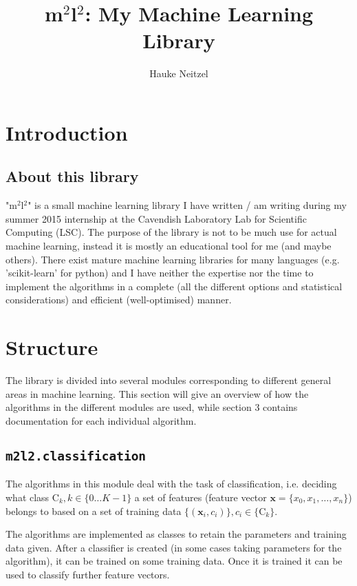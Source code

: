 \documentclass[a4paper, 12pt]{article}
\title{m$^2$l$^2$: My Machine Learning Library}
\author{Hauke Neitzel}
\begin{document}
\maketitle
\newpage

\section{Introduction}
\subsection{About this library}
"m$^2$l$^2$" is a small machine learning library I have written / am writing during my summer 2015 internship at the Cavendish Laboratory Lab for Scientific Computing (LSC). The purpose of the library is not to be much use for actual machine learning, instead it is mostly an educational tool for me (and maybe others). There exist mature machine learning libraries for many languages (e.g. 'scikit-learn' for python) and I have neither the expertise nor the time to implement the algorithms in a complete (all the different options and statistical considerations) and efficient (well-optimised) manner.


\section{Structure}
The library is divided into several modules corresponding to different general areas in machine learning. This section will give an overview of how the algorithms in the different modules are used, while section 3 contains documentation for each individual algorithm.

\subsection{\lstinline$m2l2.classification$}
The algorithms in this module deal with the task of classification, i.e. deciding what class $\mathrm{C}_k, k \in \{0 \ldots K-1\}$ a set of features (feature vector $\mathbf{x} = \{x_0, x_1, \ldots, x_n\}$) belongs to based on a set of training data $\{(\mathbf{x}_i, c_i)\}, c_i \in \{\mathrm{C}_k\}$.

The algorithms are implemented as classes to retain the parameters and training data given. After a classifier is created (in some cases taking parameters for the algorithm), it can be trained on some training data. Once it is trained it can be used to classify further feature vectors.
\end{document}
